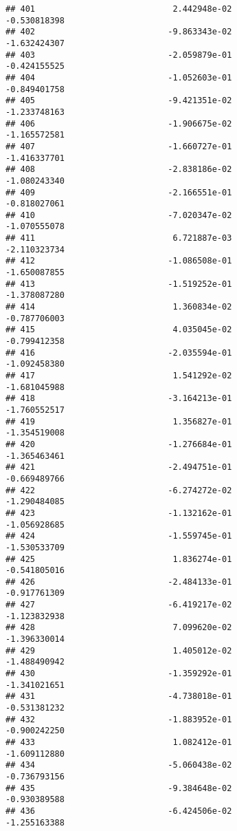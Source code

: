 \documentclass[
]{article}
\begin{document}
\begin{verbatim}
## 401                            2.442948e-02               -0.530818398
## 402                           -9.863343e-02               -1.632424307
## 403                           -2.059879e-01               -0.424155525
## 404                           -1.052603e-01               -0.849401758
## 405                           -9.421351e-02               -1.233748163
## 406                           -1.906675e-02               -1.165572581
## 407                           -1.660727e-01               -1.416337701
## 408                           -2.838186e-02               -1.080243340
## 409                           -2.166551e-01               -0.818027061
## 410                           -7.020347e-02               -1.070555078
## 411                            6.721887e-03               -2.110323734
## 412                           -1.086508e-01               -1.650087855
## 413                           -1.519252e-01               -1.378087280
## 414                            1.360834e-02               -0.787706003
## 415                            4.035045e-02               -0.799412358
## 416                           -2.035594e-01               -1.092458380
## 417                            1.541292e-02               -1.681045988
## 418                           -3.164213e-01               -1.760552517
## 419                            1.356827e-01               -1.354519008
## 420                           -1.276684e-01               -1.365463461
## 421                           -2.494751e-01               -0.669489766
## 422                           -6.274272e-02               -1.290484085
## 423                           -1.132162e-01               -1.056928685
## 424                           -1.559745e-01               -1.530533709
## 425                            1.836274e-01               -0.541805016
## 426                           -2.484133e-01               -0.917761309
## 427                           -6.419217e-02               -1.123832938
## 428                            7.099620e-02               -1.396330014
## 429                            1.405012e-02               -1.488490942
## 430                           -1.359292e-01               -1.341021651
## 431                           -4.738018e-01               -0.531381232
## 432                           -1.883952e-01               -0.900242250
## 433                            1.082412e-01               -1.609112880
## 434                           -5.060438e-02               -0.736793156
## 435                           -9.384648e-02               -0.930389588
## 436                           -6.424506e-02               -1.255163388

\end{verbatim}
\end{document}
